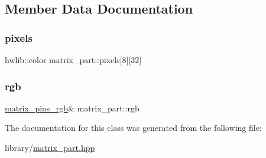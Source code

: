 \subsection{Member Data Documentation}
\mbox{\label{classmatrix__part_a7835744cd69247b16070d6292eced407}} 
\subsubsection{\texorpdfstring{pixels}{pixels}}
{\footnotesize\ttfamily hwlib\+::color matrix\+\_\+part\+::pixels\mbox{[}8\mbox{]}\mbox{[}32\mbox{]}}

\mbox{\label{classmatrix__part_a45da93a3e56a7cd58afb246f960d0bf2}} 
\subsubsection{\texorpdfstring{rgb}{rgb}}
{\footnotesize\ttfamily \hyperlink{classmatrix__pins__rgb}{matrix\+\_\+pins\+\_\+rgb}\& matrix\+\_\+part\+::rgb\hspace{0.3cm}{\ttfamily [private]}}



The documentation for this class was generated from the following file\+:\begin{DoxyCompactItemize}
\item 
library/\hyperlink{matrix__part_8hpp}{matrix\+\_\+part.\+hpp}\end{DoxyCompactItemize}
